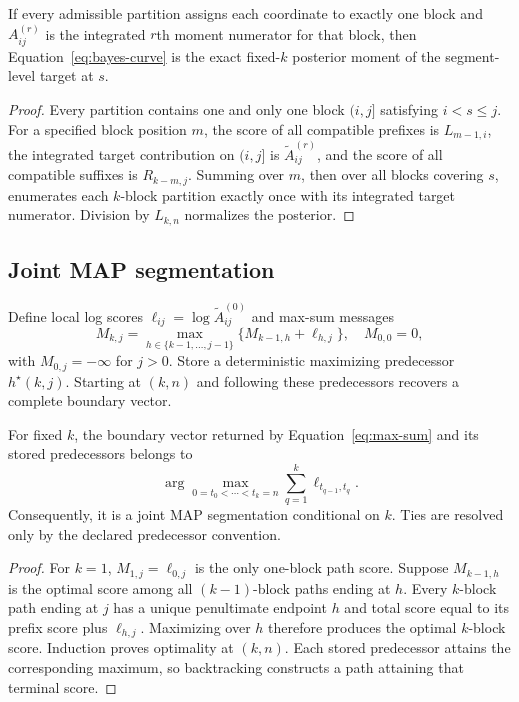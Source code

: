 \begin{proposition}
\label{prop:block-cover}
If every admissible partition assigns each coordinate to exactly one block and $A^{(r)}_{ij}$ is the integrated $r$th moment numerator for that block, then Equation~\eqref{eq:bayes-curve} is the exact fixed-$k$ posterior moment of the segment-level target at $s$.
\end{proposition}
\begin{proof}
Every partition contains one and only one block $(i,j]$ satisfying $i<s\le j$. For a specified block position $m$, the score of all compatible prefixes is $L_{m-1,i}$, the integrated target contribution on $(i,j]$ is $\widetilde A^{(r)}_{ij}$, and the score of all compatible suffixes is $R_{k-m,j}$. Summing over $m$, then over all blocks covering $s$, enumerates each $k$-block partition exactly once with its integrated target numerator. Division by $L_{k,n}$ normalizes the posterior.
\end{proof}

\subsection{Joint MAP segmentation}
Define local log scores $\ell_{ij}=\log\widetilde A^{(0)}_{ij}$ and max-sum messages
\begin{equation}
M_{k,j}=\max_{h\in\{k-1,\ldots,j-1\}}
       \{M_{k-1,h}+\ell_{h,j}\},
\quad M_{0,0}=0,
\label{eq:max-sum}
\end{equation}
with $M_{0,j}=-\infty$ for $j>0$. Store a deterministic maximizing predecessor $h^\star(k,j)$. Starting at $(k,n)$ and following these predecessors recovers a complete boundary vector.

\begin{theorem}
\label{thm:map-correctness-paper}
For fixed $k$, the boundary vector returned by Equation~\eqref{eq:max-sum} and its stored predecessors belongs to
\begin{equation}
\arg\max_{0=t_0<\cdots<t_k=n}
  \sum_{q=1}^{k}\ell_{t_{q-1},t_q}.
\label{eq:joint-map-objective}
\end{equation}
Consequently, it is a joint MAP segmentation conditional on $k$. Ties are resolved only by the declared predecessor convention.
\end{theorem}
\begin{proof}
For $k=1$, $M_{1,j}=\ell_{0,j}$ is the only one-block path score. Suppose $M_{k-1,h}$ is the optimal score among all $(k-1)$-block paths ending at $h$. Every $k$-block path ending at $j$ has a unique penultimate endpoint $h$ and total score equal to its prefix score plus $\ell_{h,j}$. Maximizing over $h$ therefore produces the optimal $k$-block score. Induction proves optimality at $(k,n)$. Each stored predecessor attains the corresponding maximum, so backtracking constructs a path attaining that terminal score.
\end{proof}


